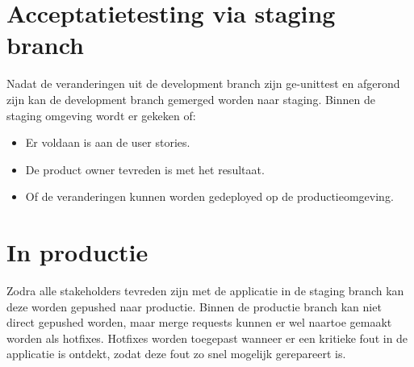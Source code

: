 \clearpage
\section{Acceptatietesting via staging branch}
Nadat de veranderingen uit de development branch zijn ge-unittest en afgerond zijn kan de development branch gemerged worden naar staging.
Binnen de staging omgeving wordt er gekeken of:
\begin{itemize}
	\item Er voldaan is aan de user stories.
	\item De product owner tevreden is met het resultaat.
	\item Of de veranderingen kunnen worden gedeployed op de productieomgeving.
\end{itemize}

\section{In productie}
Zodra alle stakeholders tevreden zijn met de applicatie in de staging branch kan deze worden gepushed naar productie.
Binnen de productie branch kan niet direct gepushed worden, maar merge requests kunnen er wel naartoe gemaakt worden als hotfixes. Hotfixes worden toegepast wanneer er een kritieke fout in de applicatie is ontdekt, zodat deze fout zo snel mogelijk gerepareert is.
